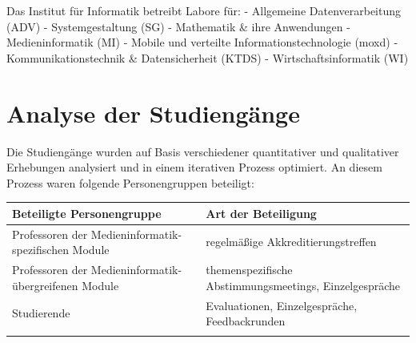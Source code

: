 Das Institut für Informatik betreibt Labore für: - Allgemeine
Datenverarbeitung (ADV) - Systemgestaltung (SG) - Mathematik \& ihre
Anwendungen - Medieninformatik (MI) - Mobile und verteilte
Informationstechnologie (moxd) - Kommunikationstechnik \&
Datensicherheit (KTDS) - Wirtschaftsinformatik (WI)

\chapter{Analyse der Studiengänge}\label{analyse-der-studienguxe4nge}

Die Studiengänge wurden auf Basis verschiedener quantitativer und
qualitativer Erhebungen analysiert und in einem iterativen Prozess
optimiert. An diesem Prozess waren folgende Personengruppen beteiligt:

\begin{longtable}[c]{@{}ll@{}}
\toprule
\begin{minipage}[b]{0.5\columnwidth}\raggedright\strut
Beteiligte Personengruppe
\strut\end{minipage} &
\begin{minipage}[b]{0.5\columnwidth}\raggedright\strut
Art der Beteiligung
\strut\end{minipage}\tabularnewline
\midrule
\endhead
\begin{minipage}[t]{0.5\columnwidth}\raggedright\strut
Professoren der Medieninformatik-spezifischen Module
\strut\end{minipage} &
\begin{minipage}[t]{0.5\columnwidth}\raggedright\strut
regelmäßige Akkreditierungstreffen
\strut\end{minipage}\tabularnewline
\begin{minipage}[t]{0.5\columnwidth}\raggedright\strut
Professoren der Medieninformatik-übergreifenen Module
\strut\end{minipage} &
\begin{minipage}[t]{0.5\columnwidth}\raggedright\strut
themenspezifische Abstimmungsmeetings, Einzelgespräche
\strut\end{minipage}\tabularnewline
\begin{minipage}[t]{0.5\columnwidth}\raggedright\strut
Studierende
\strut\end{minipage} &
\begin{minipage}[t]{0.5\columnwidth}\raggedright\strut
Evaluationen, Einzelgespräche, Feedbackrunden
\strut\end{minipage}\tabularnewline
\begin{minipage}[t]{0.5\columnwidth}\raggedright\strut

\end{minipage}
\end{longtable}
